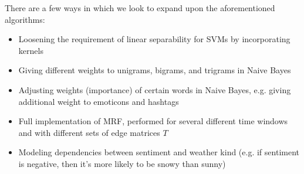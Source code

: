 There are a few ways in which we look to expand upon the aforementioned algorithms:

\begin{itemize}
\item Loosening the requirement of linear separability for SVMs by incorporating kernels
\item Giving different weights to unigrams, bigrams, and trigrams in Naive Bayes
\item Adjusting weights (importance) of certain words in Naive Bayes, e.g. giving additional weight to emoticons and hashtags
\item Full implementation of MRF, performed for several different time windows and with different sets of edge matrices $T$
\item Modeling dependencies between sentiment and weather kind (e.g. if sentiment is negative, then it's more likely to be snowy than sunny)
\end{itemize}
